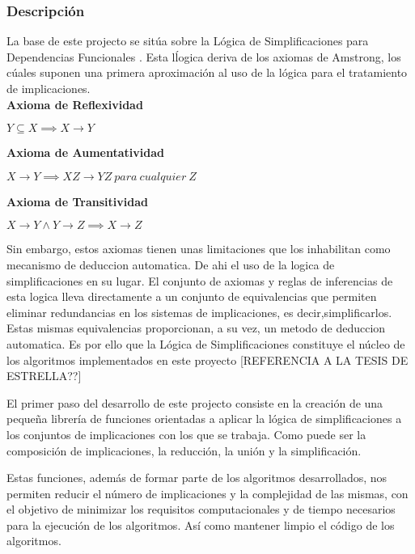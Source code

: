 \subsubsection{Descripci\'on} 

La base de este projecto se sit\'ua sobre la L\'ogica de Simplificaciones para Dependencias Funcionales \cite{Cordero2002}. Esta l\'logica deriva de los axiomas de Amstrong, los c\'uales suponen una primera aproximaci\'on al uso de la l\'ogica para el tratamiento de implicaciones.\\

\textbf{Axioma de Reflexividad}

\begin{center}
    \(Y \subseteq X \implies X \to Y \)
\end{center}

\textbf{Axioma de Aumentatividad}

\begin{center}
    \(X \to Y \implies XZ \to YZ \ para \ cualquier \ Z \)
\end{center}

\textbf{Axioma de Transitividad}

\begin{center}
    \(X \to Y \wedge Y \to Z \implies X \to Z \)
\end{center}

Sin embargo, estos axiomas tienen unas limitaciones que los inhabilitan como mecanismo de deduccion automatica. De ahi el uso de la logica de simplificaciones en su lugar. El conjunto de axiomas y reglas de inferencias de esta logica lleva directamente a un conjunto de equivalencias que permiten eliminar redundancias en los sistemas de implicaciones, es decir,simplificarlos. Estas mismas equivalencias proporcionan, a su vez, un metodo de deduccion automatica. Es por ello que la L\'ogica de Simplificaciones constituye el n\'ucleo de los algoritmos implementados en este proyecto [REFERENCIA A LA TESIS DE ESTRELLA??]




El primer paso del desarrollo de este projecto consiste en la creaci\'on de una peque\~na librer\'ia de funciones
orientadas a aplicar la l\'ogica de simplificaciones a los conjuntos de implicaciones con los que se trabaja. Como 
puede ser la composici\'on de implicaciones, la reducci\'on, la uni\'on y la simplificaci\'on.

Estas funciones, adem\'as de formar parte de los algoritmos desarrollados, nos permiten reducir el n\'umero de 
implicaciones y la complejidad de las mismas, con el objetivo de minimizar los requisitos computacionales y de tiempo
necesarios para la ejecuci\'on de los algoritmos. As\'i como mantener limpio el c\'odigo de los algoritmos.

